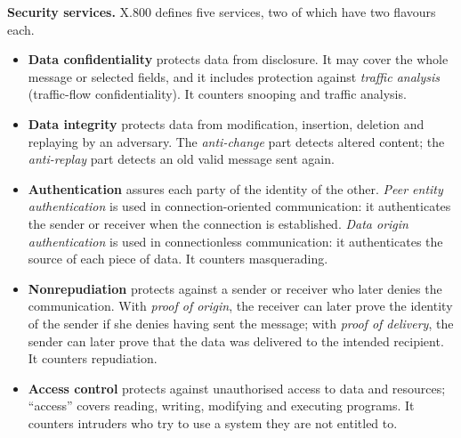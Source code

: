 \textbf{Security services.} X.800 defines five services, two of which have two flavours each.
\begin{center}
\end{center}
\begin{itemize}[leftmargin=1.4em]
  \item \textbf{Data confidentiality} protects data from disclosure. It may cover the whole message or selected fields, and it includes protection against \emph{traffic analysis} (traffic-flow confidentiality). It counters snooping and traffic analysis.
  \item \textbf{Data integrity} protects data from modification, insertion, deletion and replaying by an adversary. The \emph{anti-change} part detects altered content; the \emph{anti-replay} part detects an old valid message sent again.
  \item \textbf{Authentication} assures each party of the identity of the other. \emph{Peer entity authentication} is used in connection-oriented communication: it authenticates the sender or receiver when the connection is established. \emph{Data origin authentication} is used in connectionless communication: it authenticates the source of each piece of data. It counters masquerading.
  \item \textbf{Nonrepudiation} protects against a sender or receiver who later denies the communication. With \emph{proof of origin}, the receiver can later prove the identity of the sender if she denies having sent the message; with \emph{proof of delivery}, the sender can later prove that the data was delivered to the intended recipient. It counters repudiation.
  \item \textbf{Access control} protects against unauthorised access to data and resources; ``access'' covers reading, writing, modifying and executing programs. It counters intruders who try to use a system they are not entitled to.
\end{itemize}

